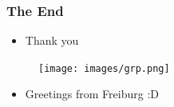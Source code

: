 \documentclass{beamer}
\newcommand{\red}[1]{\textcolor{red}{#1}}
\begin{document}
\begin{frame}
    \frametitle{The End}
    
    \begin{itemize}
        \item  Thank you
    \end{itemize}
    \begin{figure}[ht]
        \centering
        \texttt{[image: images/grp.png]}
    \end{figure}
    
    \begin{itemize}
        \item  Greetings from Freiburg :D
    \end{itemize}
\end{frame}


%
\end{document}
